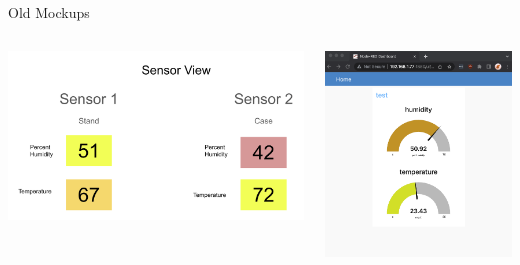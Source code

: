 \documentclass[aspectratio=169]{beamer}
\begin{document}
  \section{\sectitle}
  \begin{frame}{\sectitle}{Old Mockups}
    \begin{columns}
      \begin{column}{.5\textwidth}
        \includegraphics[width=\textwidth]{images/sensor-overview.png}
      \end{column}
      \begin{column}{.5\textwidth}
        \includegraphics[width=\textwidth]{images/test-dashboard.png}
      \end{column}
    \end{columns}
  \end{frame}
\end{document}
